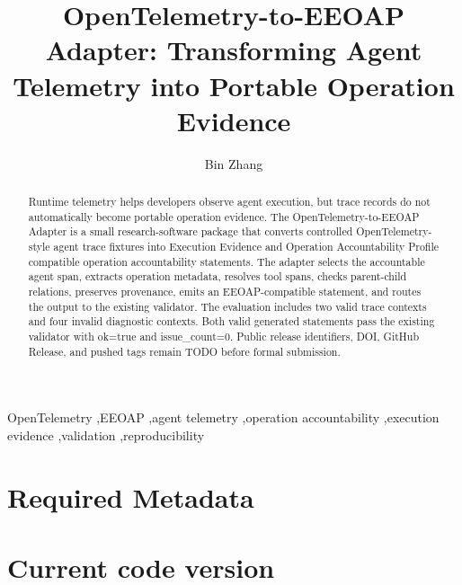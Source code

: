 \documentclass[preprint,12pt,a4paper]{elsarticle}
\begin{document}
\begin{frontmatter}

\title{OpenTelemetry-to-EEOAP Adapter: Transforming Agent Telemetry into Portable Operation Evidence}

\author{Bin Zhang}
\address{TODO: confirm public affiliation before external submission}

\begin{abstract}
Runtime telemetry helps developers observe agent execution, but trace records do
not automatically become portable operation evidence. The OpenTelemetry-to-EEOAP
Adapter is a small research-software package that converts controlled
OpenTelemetry-style agent trace fixtures into Execution Evidence and Operation
Accountability Profile compatible operation accountability statements. The
adapter selects the accountable agent span, extracts operation metadata,
resolves tool spans, checks parent-child relations, preserves provenance, emits
an EEOAP-compatible statement, and routes the output to the existing validator.
The evaluation includes two valid trace contexts and four invalid diagnostic
contexts. Both valid generated statements pass the existing validator with
ok=true and issue_count=0. Public release identifiers, DOI, GitHub Release, and
pushed tags remain TODO before formal submission.
\end{abstract}

\begin{keyword}
OpenTelemetry \sep EEOAP \sep agent telemetry \sep operation accountability \sep execution evidence \sep validation \sep reproducibility
\end{keyword}

\end{frontmatter}

\section*{Required Metadata}

\section*{Current code version}
\end{document}
